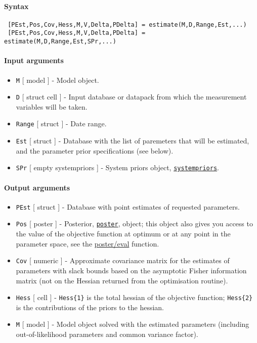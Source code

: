 


	\paragraph{Syntax}
 
 \begin{verbatim}
 [PEst,Pos,Cov,Hess,M,V,Delta,PDelta] = estimate(M,D,Range,Est,...)
 [PEst,Pos,Cov,Hess,M,V,Delta,PDelta] = estimate(M,D,Range,Est,SPr,...)
 \end{verbatim}
 
 \paragraph{Input arguments}
 
 \begin{itemize}
 \item
   \texttt{M} {[} model {]} - Model object.
 \item
   \texttt{D} {[} struct \textbar{} cell {]} - Input database or datapack
   from which the measurement variables will be taken.
 \item
   \texttt{Range} {[} struct {]} - Date range.
 \item
   \texttt{Est} {[} struct {]} - Database with the list of paremeters
   that will be estimated, and the parameter prior specifications (see
   below).
 \item
   \texttt{SPr} {[} empty \textbar{} systempriors {]} - System priors
   object, \href{systempriors/Contents}{\texttt{systempriors}}.
 \end{itemize}
 
 \paragraph{Output arguments}
 
 \begin{itemize}
 \item
   \texttt{PEst} {[} struct {]} - Database with point estimates of
   requested parameters.
 \item
   \texttt{Pos} {[} poster {]} - Posterior,
   \href{poster/Contents}{\texttt{poster}}, object; this object also
   gives you access to the value of the objective function at optimum or
   at any point in the parameter space, see the \url{poster/eval}
   function.
 \item
   \texttt{Cov} {[} numeric {]} - Approximate covariance matrix for the
   estimates of parameters with slack bounds based on the asymptotic
   Fisher information matrix (not on the Hessian returned from the
   optimisation routine).
 \item
   \texttt{Hess} {[} cell {]} - \texttt{Hess\{1\}} is the total hessian
   of the objective function; \texttt{Hess\{2\}} is the contributions of
   the priors to the hessian.
 \item
   \texttt{M} {[} model {]} - Model object solved with the estimated
   parameters (including out-of-likelihood parameters and common variance
   factor).
 \end{itemize}
 
